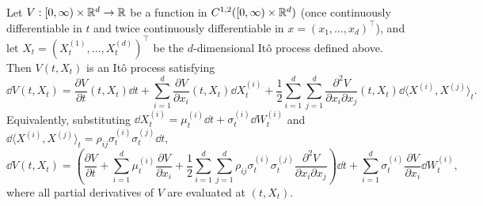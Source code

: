 \begin{theorem}
\label{thm:multidim-ito}
Let $V : [0, \infty) \times \mathbb{R}^d \to \mathbb{R}$ be a function in $C^{1,2}([0, \infty) \times \mathbb{R}^d)$ (once continuously differentiable in $t$ and twice continuously differentiable in $x = (x_1, \dots, x_d)^\top$), and let $X_t = (X_t^{(1)}, \dots, X_t^{(d)})^\top$ be the $d$-dimensional It\^o process defined above. Then $V(t, X_t)$ is an It\^o process satisfying
\begin{equation}
\label{eq:multidim-ito}
\dd V(t, X_t) = \frac{\partial V}{\partial t}(t, X_t)\dd t + \sum_{i=1}^{d} \frac{\partial V}{\partial x_i}(t, X_t)\dd X_t^{(i)} + \frac{1}{2}\sum_{i=1}^{d}\sum_{j=1}^{d} \frac{\partial^2 V}{\partial x_i \partial x_j}(t, X_t)\dd\langle X^{(i)}, X^{(j)} \rangle_t.
\end{equation}
Equivalently, substituting $\dd X_t^{(i)} = \mu_t^{(i)}\dd t + \sigma_t^{(i)}\dd W_t^{(i)}$ and $\dd\langle X^{(i)}, X^{(j)} \rangle_t = \rho_{ij}\sigma_t^{(i)}\sigma_t^{(j)}\dd t$,
\[
\dd V(t, X_t) = \left(\frac{\partial V}{\partial t} + \sum_{i=1}^{d} \mu_t^{(i)} \frac{\partial V}{\partial x_i} + \frac{1}{2}\sum_{i=1}^{d}\sum_{j=1}^{d} \rho_{ij}\sigma_t^{(i)}\sigma_t^{(j)}\frac{\partial^2 V}{\partial x_i \partial x_j}\right)\dd t + \sum_{i=1}^{d} \sigma_t^{(i)} \frac{\partial V}{\partial x_i}\dd W_t^{(i)},
\]
where all partial derivatives of $V$ are evaluated at $(t, X_t)$.
\end{theorem}

